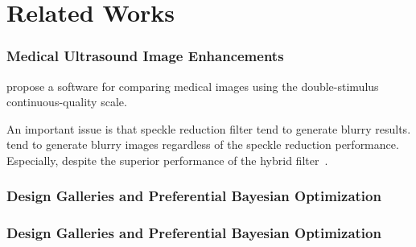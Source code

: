 
\section{Related Works}\label{section:relatedworks}
\subsubsection{Medical Ultrasound Image Enhancements}
\cite{hemmsen_ultrasound_2010} propose a software for comparing medical images using the double-stimulus continuous-quality scale.

An important issue is that speckle reduction filter tend to generate blurry results.
\cite{deng_speckle_2011, wong_monte_2012, hu_cluster_2016, singh_hybrid_2017, nagare_multi_2017} tend to generate blurry images regardless of the speckle reduction performance.
Especially, despite the superior performance of the hybrid filter~\cite{singh_hybrid_2017}.

\subsubsection{Design Galleries and Preferential Bayesian Optimization}

\subsubsection{Design Galleries and Preferential Bayesian Optimization}

